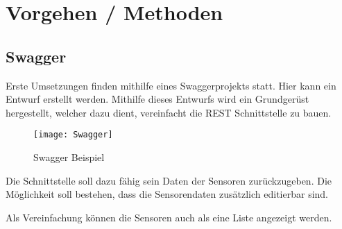 \documentclass[../main.tex]{subfiles}
\begin{document}
	\section{Vorgehen / Methoden}
	
	\subsection{Swagger}
	Erste Umsetzungen finden mithilfe eines Swaggerprojekts statt. Hier kann ein Entwurf erstellt werden. Mithilfe dieses Entwurfs wird ein Grundgerüst hergestellt, welcher dazu dient, vereinfacht die REST Schnittstelle zu bauen.
	
	\begin{figure}[h]
		\centering
		\texttt{[image: Swagger]}
		\caption{Swagger Beispiel}
		\label{fig:Swagger}
	\end{figure}
	
	Die Schnittstelle soll dazu fähig sein Daten der Sensoren zurückzugeben. Die Möglichkeit soll bestehen, dass die Sensorendaten zusätzlich editierbar sind.
	
	Als Vereinfachung können die Sensoren auch als eine Liste angezeigt werden.
	
\end{document}
